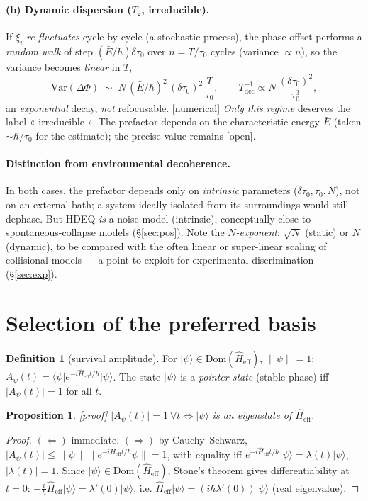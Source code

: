 \documentclass[11pt,a4paper]{article}
\newcommand{\ket}[1]{\lvert #1\rangle}
\newcommand{\bra}[1]{\langle #1\rvert}
\newcommand{\Heff}{\hat{H}_{\mathrm{eff}}}
\newcommand{\statut}[1]{{\footnotesize\textsf{[#1]}}}
\theoremstyle{plain}
\newtheorem{proposition}{Proposition}
\theoremstyle{definition}
\newtheorem{definition}{Definition}
\theoremstyle{remark}
\begin{document}
\paragraph{(b) Dynamic dispersion ($T_2$, irreducible).} If $\xi_i$
\emph{re-fluctuates} cycle by cycle (a stochastic process), the phase offset performs a \emph{random walk} of step $(\bar E/\hbar)\delta\tau_0$ over $n=T/\tau_0$ cycles (variance $\propto n$), so the variance becomes
\emph{linear} in $T$,
\[
\mathrm{Var}(\Delta\Phi)\;\sim\; N\,(\bar E/\hbar)^2\,(\delta\tau_0)^2\,\frac{T}{\tau_0},
\qquad
T_{\mathrm{dec}}^{-1}\propto N\,\frac{(\delta\tau_0)^2}{\tau_0^3},
\]
an \emph{exponential} decay, \emph{not} refocusable. \statut{numerical}
\emph{Only this regime} deserves the label « irreducible ». The prefactor depends
on the characteristic energy $\bar E$ (taken $\sim\hbar/\tau_0$ for the estimate);
the precise value remains \statut{open}.

\paragraph{Distinction from environmental decoherence.} In both cases, the
prefactor depends only on \emph{intrinsic} parameters ($\delta\tau_0,\tau_0,N$),
not on an external bath; a system ideally isolated from its surroundings would
still dephase. But HDEQ \emph{is} a noise model (intrinsic), conceptually close
to spontaneous-collapse models (\S\ref{sec:pos}). Note the \emph{$N$-exponent}:
$\sqrt N$ (static) or $N$ (dynamic), to be compared with the often linear or
super-linear scaling of collisional models --- a point to exploit for
experimental discrimination (\S\ref{sec:exp}).

\section{Selection of the preferred basis}\label{sec:base}

\begin{definition}[survival amplitude]
For $\ket{\psi}\in\mathrm{Dom}(\Heff)$, $\lVert\psi\rVert=1$:
$A_\psi(t)=\bra{\psi}e^{-i\Heff t/\hbar}\ket{\psi}$. The state $\ket{\psi}$ is a
\emph{pointer state} (stable phase) iff $\lvert A_\psi(t)\rvert=1$ for all $t$.
\end{definition}

\begin{proposition}\label{prop:base}\statut{proof}
$\lvert A_\psi(t)\rvert=1\ \forall t\iff\ket{\psi}$ is an eigenstate of $\Heff$.
\end{proposition}
\begin{proof}
$(\Leftarrow)$ immediate. $(\Rightarrow)$ by Cauchy--Schwarz,
$\lvert A_\psi(t)\rvert\le\lVert\psi\rVert\,\lVert e^{-i\Heff t/\hbar}\psi\rVert=1$,
with equality iff $e^{-i\Heff t/\hbar}\ket{\psi}=\lambda(t)\ket{\psi}$,
$\lvert\lambda(t)\rvert=1$. Since $\ket{\psi}\in\mathrm{Dom}(\Heff)$, Stone's
theorem gives differentiability at $t=0$:
$-\tfrac{i}{\hbar}\Heff\ket{\psi}=\lambda'(0)\ket{\psi}$, i.e.
$\Heff\ket{\psi}=(i\hbar\lambda'(0))\ket{\psi}$ (real eigenvalue).
\end{proof}
\end{document}
